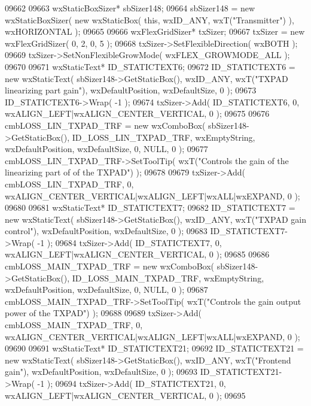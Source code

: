 \begin{DoxyCode}
09662     
09663     wxStaticBoxSizer* sbSizer148;
09664     sbSizer148 = \textcolor{keyword}{new} wxStaticBoxSizer( \textcolor{keyword}{new} wxStaticBox( \textcolor{keyword}{this}, wxID\_ANY, wxT(\textcolor{stringliteral}{"Transmitter"}) ), wxHORIZONTAL 
      );
09665     
09666     wxFlexGridSizer* txSizer;
09667     txSizer = \textcolor{keyword}{new} wxFlexGridSizer( 0, 2, 0, 5 );
09668     txSizer->SetFlexibleDirection( wxBOTH );
09669     txSizer->SetNonFlexibleGrowMode( wxFLEX\_GROWMODE\_ALL );
09670     
09671     wxStaticText* ID\_STATICTEXT6;
09672     ID\_STATICTEXT6 = \textcolor{keyword}{new} wxStaticText( sbSizer148->GetStaticBox(), wxID\_ANY, wxT(\textcolor{stringliteral}{"TXPAD linearizing part
       gain"}), wxDefaultPosition, wxDefaultSize, 0 );
09673     ID\_STATICTEXT6->Wrap( -1 );
09674     txSizer->Add( ID\_STATICTEXT6, 0, wxALIGN\_LEFT|wxALIGN\_CENTER\_VERTICAL, 0 );
09675     
09676     cmbLOSS_LIN_TXPAD_TRF = \textcolor{keyword}{new} wxComboBox( sbSizer148->GetStaticBox(), 
      ID_LOSS_LIN_TXPAD_TRF, wxEmptyString, wxDefaultPosition, wxDefaultSize, 0, NULL, 0 ); 
09677     cmbLOSS_LIN_TXPAD_TRF->SetToolTip( wxT(\textcolor{stringliteral}{"Controls the gain of the linearizing part of of the TXPAD"}) );
09678     
09679     txSizer->Add( cmbLOSS_LIN_TXPAD_TRF, 0, wxALIGN\_CENTER\_VERTICAL|wxALIGN\_LEFT|wxALL|wxEXPAND, 0 );
09680     
09681     wxStaticText* ID\_STATICTEXT7;
09682     ID\_STATICTEXT7 = \textcolor{keyword}{new} wxStaticText( sbSizer148->GetStaticBox(), wxID\_ANY, wxT(\textcolor{stringliteral}{"TXPAD gain control"}), 
      wxDefaultPosition, wxDefaultSize, 0 );
09683     ID\_STATICTEXT7->Wrap( -1 );
09684     txSizer->Add( ID\_STATICTEXT7, 0, wxALIGN\_LEFT|wxALIGN\_CENTER\_VERTICAL, 0 );
09685     
09686     cmbLOSS_MAIN_TXPAD_TRF = \textcolor{keyword}{new} wxComboBox( sbSizer148->GetStaticBox(), 
      ID_LOSS_MAIN_TXPAD_TRF, wxEmptyString, wxDefaultPosition, wxDefaultSize, 0, NULL, 0 ); 
09687     cmbLOSS_MAIN_TXPAD_TRF->SetToolTip( wxT(\textcolor{stringliteral}{"Controls the gain  output power of the TXPAD"}) );
09688     
09689     txSizer->Add( cmbLOSS_MAIN_TXPAD_TRF, 0, wxALIGN\_CENTER\_VERTICAL|wxALIGN\_LEFT|wxALL|wxEXPAND, 0 );
09690     
09691     wxStaticText* ID\_STATICTEXT21;
09692     ID\_STATICTEXT21 = \textcolor{keyword}{new} wxStaticText( sbSizer148->GetStaticBox(), wxID\_ANY, wxT(\textcolor{stringliteral}{"Frontend gain"}), 
      wxDefaultPosition, wxDefaultSize, 0 );
09693     ID\_STATICTEXT21->Wrap( -1 );
09694     txSizer->Add( ID\_STATICTEXT21, 0, wxALIGN\_LEFT|wxALIGN\_CENTER\_VERTICAL, 0 );
09695     

\end{DoxyCode}
